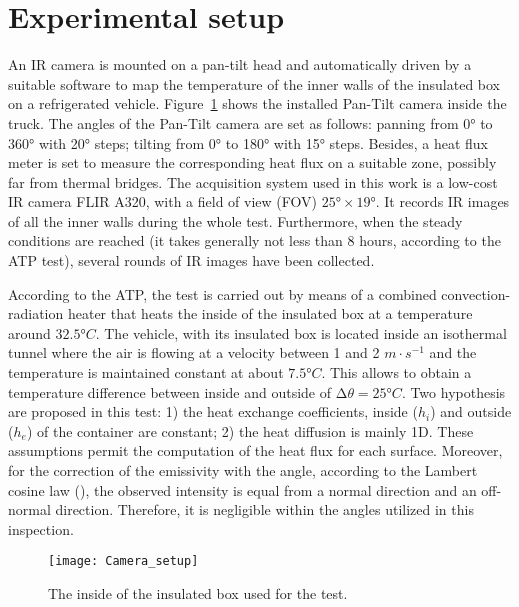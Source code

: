 \documentclass{tQRT2e}
\begin{document}
\section{Experimental setup}
An IR camera is mounted on a pan-tilt head and automatically driven by a suitable software to map the temperature of the inner walls of the insulated box on a refrigerated vehicle. Figure~\ref{Exp_setup} shows the installed Pan-Tilt camera inside the truck. The angles of the Pan-Tilt camera are set as follows: panning from 0° to 360° with 20° steps; tilting from 0° to 180° with 15° steps. Besides, a heat flux meter is set to measure the corresponding heat flux on a suitable zone, possibly far from thermal bridges. The acquisition system used in this work is a low-cost IR camera FLIR A320, with a field of view (FOV) $ 25°×19° $. It records IR images of all the inner walls during the whole test. Furthermore, when the steady conditions are reached (it takes generally not less than 8 hours, according to the ATP test), several rounds of IR images have been collected.

According to the ATP, the test is carried out by means of a combined convection-radiation heater that heats the inside of the insulated box at a temperature around $ 32.5°C $. The vehicle, with its insulated box is located inside an isothermal tunnel where the air is flowing at a velocity between 1 and 2 $ m⋅s^{−1} $ and the temperature is maintained constant at about $ 7.5 °C $. This allows to obtain a temperature difference between inside and outside of $ ∆\theta  = 25°C$. Two hypothesis are proposed in this test: 1) the heat exchange coefficients, inside ($ h_i $) and outside ($ h_e $) of the container are constant; 2) the heat diffusion is mainly 1D. These assumptions permit the computation of the heat flux for each surface. Moreover, for the correction of the emissivity with the angle, according to the Lambert cosine law (\cite{dragano2009experimental,Hottel1967a}), the observed intensity is equal from a normal direction and an off-normal direction. Therefore, it is negligible within the angles utilized in this inspection.
\begin{figure}[ht]
	\centering
	\texttt{[image: Camera\_setup]}
	\caption{The inside of the insulated box used for the test.}
	\label{Exp_setup}
\end{figure}
\end{document}
